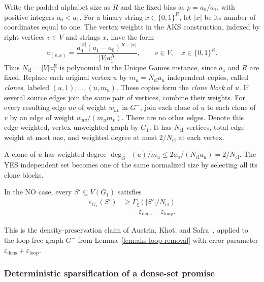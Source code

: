 Write the padded alphabet size as $R$ and the fixed bias as
$p=a_0/a_1$, with positive integers $a_0<a_1$. For a binary
string $x\in\{0,1\}^R$, let $|x|$ be its
number of coordinates equal to one. The vertex weights in the AKS
construction, indexed by right vertices $v\in V$ and strings $x$,
have the form
\[
 a_{(v,x)}=
 \frac{a_0^{|x|}(a_1-a_0)^{R-|x|}}{|V|a_1^R},
 \qquad v\in V,\quad x\in\{0,1\}^R.
\]
Thus $N_{\mathrm{cl}}=|V|a_1^R$ is polynomial in the Unique Games
instance, since $a_1$ and $R$ are fixed. Replace each original vertex
$u$ by $m_u=N_{\mathrm{cl}}a_u$ independent copies, called
\emph{clones}, labeled
$(u,1),\ldots,(u,m_u)$. These copies form the \emph{clone block} of $u$.
If several source edges join the same pair of vertices, combine their
weights. For every resulting edge $uv$ of weight $w_{uv}$ in $G^-$,
join each clone of $u$ to each clone of $v$ by an edge of weight
$w_{uv}/(m_um_v)$. There are no other edges.
Denote this edge-weighted, vertex-unweighted
graph by $G_1$. It has $N_{\mathrm{cl}}$ vertices, total edge weight
at most one, and weighted degree at most $2/N_{\mathrm{cl}}$ at each vertex.

A clone of $u$ has weighted degree
$\deg_{G^-}(u)/m_u\le2a_u/(N_{\mathrm{cl}}a_u)=2/N_{\mathrm{cl}}$.
The YES independent set becomes one of the same normalized size by
selecting all its clone blocks.

\begin{lemma}\label{lem:aks-clone-density}
In the NO case, every $S'\subseteq V(G_1)$ satisfies
\begin{equation}\label{eq:aks-clone-density}
 \begin{aligned}
 e_{G_1}(S')&\ge\Gamma_\xi(|S'|/N_{\mathrm{cl}})\\
 &\quad-\varepsilon_{\mathrm{dens}}-\varepsilon_{\mathrm{loop}}.
 \end{aligned}
\end{equation}
\end{lemma}

This is the density-preservation claim of Austrin, Khot, and
Safra~\cite[Section~4, Step~1]{AKS2011}, applied to the loop-free graph
$G^-$ from Lemma~\ref{lem:aks-loop-removal} with error parameter
$\varepsilon_{\mathrm{dens}}+\varepsilon_{\mathrm{loop}}$.

\subsubsection{Deterministic sparsification of a dense-set promise}

